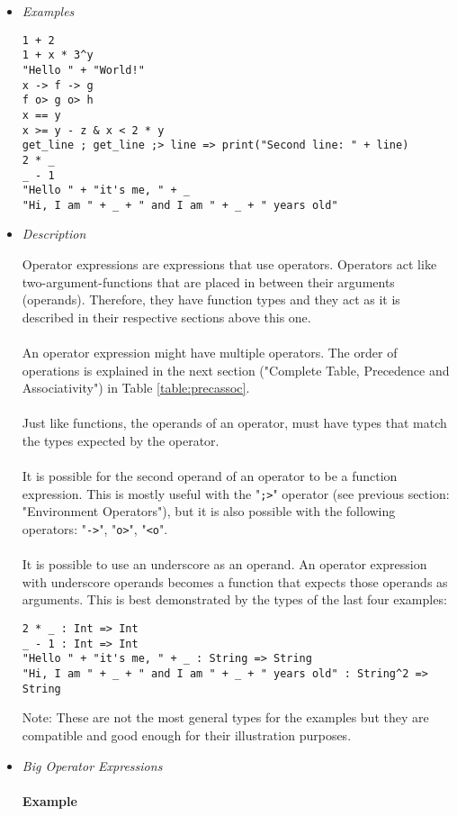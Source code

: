 \documentclass{article}
\begin{document}
\begin{itemize}
\item \textit{Examples}
\begin{verbatim}
1 + 2
1 + x * 3^y
"Hello " + "World!"
x -> f -> g
f o> g o> h
x == y
x >= y - z & x < 2 * y
get_line ; get_line ;> line => print("Second line: " + line)
2 * _
_ - 1
"Hello " + "it's me, " + _ 
"Hi, I am " + _ + " and I am " + _ + " years old"
\end{verbatim}

\item \textit{Description}

Operator expressions are expressions that use operators. Operators act like
two-argument-functions that are placed in between their arguments (operands).
Therefore, they have function types and they act as it is described in their
respective sections above this one.
\\\\
An operator expression might have multiple operators. The order of operations
is explained in the next section ("Complete Table, Precedence and
Associativity") in Table \ref{table:precassoc}.
\\\\
Just like functions, the operands of an operator, must have types that match
the types expected by the operator.
\\\\
It is possible for the second operand of an operator to be a function
expression.  This is mostly useful with the "\verb|;>|" operator (see
previous section: "Environment Operators"), but it is also possible with the
following operators: "\verb|->|", "\verb|o>|", "\verb|<o|".
\\\\
It is possible to use an underscore as an operand. An operator expression with
underscore operands becomes a function that expects those operands as
arguments.  This is best demonstrated by the types of the last four examples: 

\begin{verbatim}
2 * _ : Int => Int
_ - 1 : Int => Int
"Hello " + "it's me, " + _ : String => String
"Hi, I am " + _ + " and I am " + _ + " years old" : String^2 => String
\end{verbatim}
Note: These are not the most general types for the examples but they are
compatible and good enough for their illustration purposes.

\newpage

\item \textit{Big Operator Expressions}\\\\
\textbf{Example}


\end{itemize}
\end{document}
